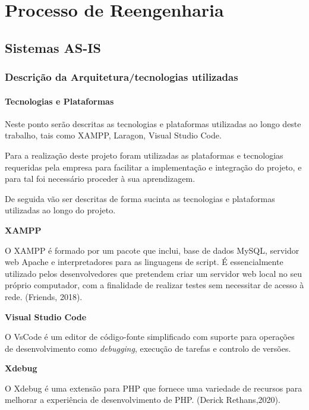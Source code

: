 
\chapter{Processo de Reengenharia}


\section{Sistemas AS-IS}
\subsection{Descrição da Arquitetura/tecnologias utilizadas}
\subsubsection{Tecnologias e Plataformas}
\par Neste ponto serão descritas as tecnologias e plataformas utilizadas ao longo deste trabalho, tais como XAMPP, Laragon, Visual Studio Code.
\par Para a realização deste projeto foram utilizadas as plataformas e tecnologias requeridas pela empresa para facilitar a implementação e integração do projeto, e para tal foi necessário proceder à sua aprendizagem.
\par De seguida vão ser descritas de forma sucinta as tecnologias e plataformas utilizadas ao longo do projeto.\newline


\textbf{XAMPP}

O XAMPP é formado por um pacote que inclui, base de dados MySQL, servidor web Apache e interpretadores para as linguagens de script. É essencialmente utilizado pelos desenvolvedores que pretendem criar um servidor web local no seu próprio computador, com a finalidade de realizar testes sem necessitar de acesso à rede. (Friends, 2018).\newline


\textbf{Visual Studio Code}

O VsCode é um editor de código-fonte simplificado com suporte para operações de desenvolvimento como \textit{debugging}, execução de tarefas e controlo de versões.\newline %

\quad \textbf{Xdebug}

\quad O Xdebug é uma extensão para PHP que fornece uma variedade de recursos para melhorar a experiência de desenvolvimento de PHP. (Derick Rethans,2020).\newline


